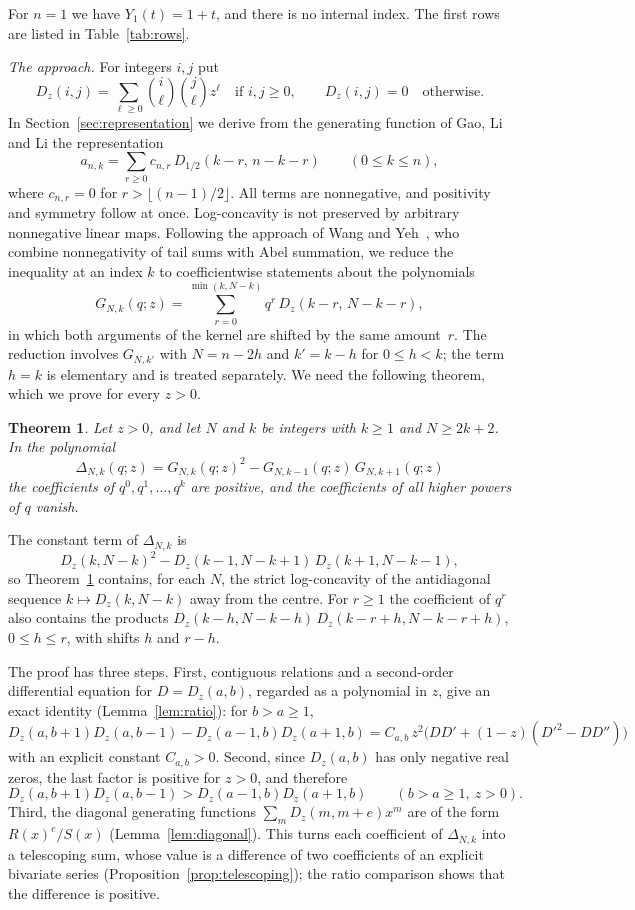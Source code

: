 \documentclass{amsart}
\newtheorem{theorem}{Theorem}[section]
\theoremstyle{definition}
\theoremstyle{remark}
\numberwithin{equation}{section}
\numberwithin{table}{section}
\newcommand{\Dz}{D_z}
\newcommand{\Dh}{D_{1/2}}
\begin{document}
For $n=1$ we have $Y_1(t)=1+t$, and there is no internal index. The first rows are listed in Table~\ref{tab:rows}.

\emph{The approach.} For integers $i,j$ put
\[
\Dz(i,j)=\sum_{\ell\ge 0}\binom{i}{\ell}\binom{j}{\ell}z^{\ell}\quad\text{if } i,j\ge 0,\qquad \Dz(i,j)=0\quad\text{otherwise}.
\]
In Section~\ref{sec:representation} we derive from the generating function of Gao, Li and Li the representation
\begin{equation}\label{eq:rep-intro}
a_{n,k}=\sum_{r\ge 0}c_{n,r}\,\Dh(k-r,\,n-k-r)\qquad(0\le k\le n),
\end{equation}
where $c_{n,r}=0$ for $r>\lfloor (n-1)/2\rfloor$. All terms are nonnegative, and positivity and symmetry follow at once. Log-concavity is not preserved by arbitrary nonnegative linear maps. Following the approach of Wang and Yeh~\cite{WY}, who combine nonnegativity of tail sums with Abel summation, we reduce the inequality at an index $k$ to coefficientwise statements about the polynomials
\begin{equation}\label{eq:G-intro}
G_{N,k}(q;z)=\sum_{r=0}^{\min(k,N-k)}q^{r}\,\Dz(k-r,\,N-k-r),
\end{equation}
in which both arguments of the kernel are shifted by the same amount~$r$. The reduction involves $G_{N,k'}$ with $N=n-2h$ and $k'=k-h$ for $0\le h<k$; the term $h=k$ is elementary and is treated separately. We need the following theorem, which we prove for every $z>0$.

\begin{theorem}\label{thm:kernel}
Let $z>0$, and let $N$ and $k$ be integers with $k\ge 1$ and $N\ge 2k+2$. In the polynomial
\[
\Delta_{N,k}(q;z)=G_{N,k}(q;z)^2-G_{N,k-1}(q;z)\,G_{N,k+1}(q;z)
\]
the coefficients of $q^0,q^1,\dots,q^k$ are positive, and the coefficients of all higher powers of $q$ vanish.
\end{theorem}

The constant term of $\Delta_{N,k}$ is
\[
\Dz(k,N-k)^2-\Dz(k-1,N-k+1)\,\Dz(k+1,N-k-1),
\]
so Theorem~\ref{thm:kernel} contains, for each $N$, the strict log-concavity of the antidiagonal sequence $k\mapsto\Dz(k,N-k)$ away from the centre. For $r\ge 1$ the coefficient of $q^r$ also contains the products $\Dz(k-h,N-k-h)\,\Dz(k-r+h,N-k-r+h)$, $0\le h\le r$, with shifts $h$ and $r-h$.

The proof has three steps. First, contiguous relations and a second-order differential equation for $D=\Dz(a,b)$, regarded as a polynomial in $z$, give an exact identity (Lemma~\ref{lem:ratio}): for $b>a\ge 1$,
\[
\Dz(a,b+1)\Dz(a,b-1)-\Dz(a-1,b)\Dz(a+1,b)=C_{a,b}\,z^2\bigl(DD'+(1-z)(D'^2-DD'')\bigr)
\]
with an explicit constant $C_{a,b}>0$. Second, since $\Dz(a,b)$ has only negative real zeros, the last factor is positive for $z>0$, and therefore
\[
\Dz(a,b+1)\Dz(a,b-1)>\Dz(a-1,b)\Dz(a+1,b)\qquad(b>a\ge 1,\ z>0).
\]
Third, the diagonal generating functions $\sum_{m}\Dz(m,m+e)x^m$ are of the form $R(x)^e/S(x)$ (Lemma~\ref{lem:diagonal}). This turns each coefficient of $\Delta_{N,k}$ into a telescoping sum, whose value is a difference of two coefficients of an explicit bivariate series (Proposition~\ref{prop:telescoping}); the ratio comparison shows that the difference is positive.
\end{document}
